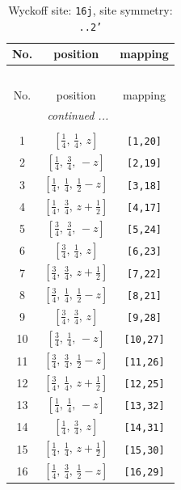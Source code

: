 \documentclass[fleqn,8pt]{jsarticle}
\begin{document}
\begin{longtable}{ccc}
\caption{Wyckoff site: {\tt 16j}, site symmetry: {\tt ..2'}}
 \\
 \hline \hline
No. & position & mapping \\ \hline \endfirsthead

\multicolumn{2}{l}{\tablename\ \thetable{}} \\
 \hline \hline
No. & position & mapping \\ \hline \endhead

 \hline \hline
\multicolumn{2}{r}{\footnotesize\it continued ...} \\ \endfoot

 \hline \hline
\multicolumn{2}{r}{} \\ \endlastfoot

1 & $\left[ \frac{1}{4},\, \frac{1}{4},\, z \right]$ & {\tt [1,20]} \\ \hline
2 & $\left[ \frac{1}{4},\, \frac{3}{4},\, - z \right]$ & {\tt [2,19]} \\ \hline
3 & $\left[ \frac{1}{4},\, \frac{1}{4},\, \frac{1}{2} - z \right]$ & {\tt [3,18]} \\ \hline
4 & $\left[ \frac{1}{4},\, \frac{3}{4},\, z + \frac{1}{2} \right]$ & {\tt [4,17]} \\ \hline
5 & $\left[ \frac{3}{4},\, \frac{3}{4},\, - z \right]$ & {\tt [5,24]} \\ \hline
6 & $\left[ \frac{3}{4},\, \frac{1}{4},\, z \right]$ & {\tt [6,23]} \\ \hline
7 & $\left[ \frac{3}{4},\, \frac{3}{4},\, z + \frac{1}{2} \right]$ & {\tt [7,22]} \\ \hline
8 & $\left[ \frac{3}{4},\, \frac{1}{4},\, \frac{1}{2} - z \right]$ & {\tt [8,21]} \\ \hline
9 & $\left[ \frac{3}{4},\, \frac{3}{4},\, z \right]$ & {\tt [9,28]} \\ \hline
10 & $\left[ \frac{3}{4},\, \frac{1}{4},\, - z \right]$ & {\tt [10,27]} \\ \hline
11 & $\left[ \frac{3}{4},\, \frac{3}{4},\, \frac{1}{2} - z \right]$ & {\tt [11,26]} \\ \hline
12 & $\left[ \frac{3}{4},\, \frac{1}{4},\, z + \frac{1}{2} \right]$ & {\tt [12,25]} \\ \hline
13 & $\left[ \frac{1}{4},\, \frac{1}{4},\, - z \right]$ & {\tt [13,32]} \\ \hline
14 & $\left[ \frac{1}{4},\, \frac{3}{4},\, z \right]$ & {\tt [14,31]} \\ \hline
15 & $\left[ \frac{1}{4},\, \frac{1}{4},\, z + \frac{1}{2} \right]$ & {\tt [15,30]} \\ \hline
16 & $\left[ \frac{1}{4},\, \frac{3}{4},\, \frac{1}{2} - z \right]$ & {\tt [16,29]} \\
\end{longtable}
\end{document}
